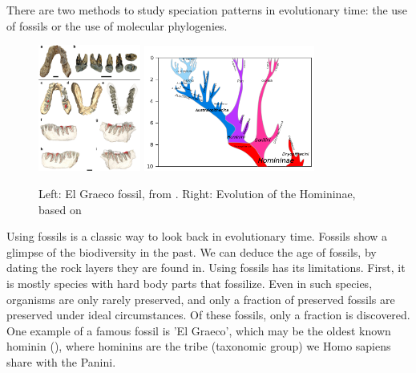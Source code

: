 There are two methods to study speciation patterns in evolutionary time:
the use of fossils or the use of molecular phylogenies.

\begin{figure}[H]
  \includegraphics[width=0.3\textwidth]{Graecopithecus.jpg}
  \includegraphics[width=0.5\textwidth]{Hominini_lineage.png}
  \caption{
    Left: El Graeco fossil, from \cite{fuss2017potential}.
    Right: Evolution of the Homininae, based on \cite{stringer2012makes}
 }
  \label{fig:human_evolution}
\end{figure}

Using fossils is a classic way to look back in evolutionary time.
Fossils show a glimpse of the biodiversity in the past.
We can deduce the age of fossils, by dating the rock layers they are found in.
Using fossils has its limitations. First, it is mostly species with hard body
parts that fossilize. Even in such species, organisms are 
only rarely preserved, and only a fraction of preserved fossils are preserved under ideal circumstances. Of 
these fossils, only a fraction is discovered.
One example of a famous fossil is 'El Graeco', 
which may be the oldest known hominin (\cite{fuss2017potential}), where
hominins are the tribe (taxonomic group) we Homo sapiens share with the Panini.

